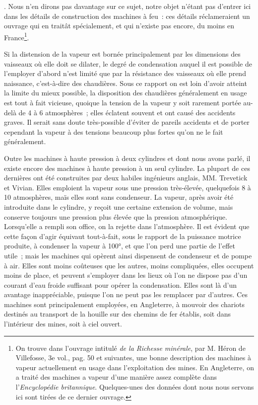 \documentclass[french,twoside]{book} %
\begin{document}
{ }. Nous n’en dirons pas davantage sur ce sujet, notre objet n’étant pas d’entrer ici dans les détails de construction des machines à feu : ces détails réclameraient un ouvrage qui en traitât spécialement, et qui n’existe pas encore, du moins en France\footnote{On trouve dans l’ouvrage intitulé \emph{de la Richesse minérale}, par M. Héron de Villefosse, 3e vol., pag. 50 et suivantes, une bonne description des machines à vapeur actuellement en usage dans l’exploitation des mines. En Angleterre, on a traité des machines a vapeur d’une manière assez complète dans l’\emph{Encyclopédie britannique}. Quelques-unes des données dont nous nous servons ici sont tirées de ce dernier ouvrage.}.\par
Si la distension de la vapeur est bornée principalement par les dimensions des vaisseaux où elle doit se dilater, le degré de condensation auquel il est possible de l’employer d’abord n’est limité que par la résistance des vaisseaux où elle prend naissance, c’est-à-dire des chaudières. Sous ce rapport on est loin d’avoir atteint la limite du mieux possible, la disposition des chaudières généralement en usage est tout à fait vicieuse, quoique la tension de la vapeur y soit rarement portée au-delà de 4 à 6 atmosphères ; elles éclatent souvent et ont causé des accidents graves. Il serait sans doute très-possible d’éviter de pareils accidents et de porter cependant la vapeur à des tensions beaucoup plus fortes qu’on ne le fait généralement.\par
Outre les machines à haute pression à deux cylindres et dont nous avons parlé, il existe encore des machines à haute pression à un seul cylindre. La plupart de ces dernières ont été construites par deux habiles ingénieurs anglais, MM. Trevetick et Vivian. Elles emploient la vapeur sous une pression très-élevée, quelquefois 8 à 10 atmosphères, maïs elles sont sans condenseur. La vapeur, après avoir été introduite dans le cylindre, y reçoit une certaine extension de volume, mais conserve toujours une pression plus élevée que la pression atmosphérique. Lorsqu’elle a rempli son office, on la rejette dans l’atmosphère. Il est évident que cette façon d’agir équivaut tout-à-fait, sous le rapport de la puissance motrice produite, à condenser la vapeur à 100°, et que l’on perd une partie de l’effet utile ; mais les machines qui opèrent ainsi dispensent de condenseur et de pompe à air. Elles sont moins coûteuses que les autres, moins compliquées, elles occupent moins de place, et peuvent s’employer dans les lieux où l’on ne dispose pas d’un courant d’eau froide suffisant pour opérer la condensation. Elles sont là d’un avantage inappréciable, puisque l’on ne peut pas les remplacer par d’autres. Ces machines sont principalement employées, en Angleterre, à mouvoir des chariots destinés au transport de la houille sur des chemins de fer établis, soit dans l’intérieur des mines, soit à ciel ouvert.\par
\end{document}
